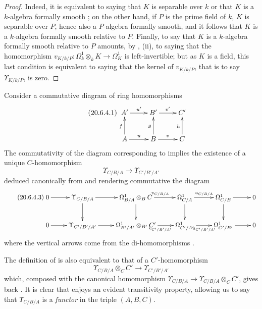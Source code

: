 \begin{proof}
Indeed, it is equivalent to saying that $K$ is separable over $k$ or that $K$ is a $k$-algebra formally smooth ; on the other hand, if $P$ is the prime field of $k$, $K$ is separable over $P$, hence also a $P$-algebra formally smooth, and it follows that $K$ is a $k$-algebra formally smooth relative to $P$.
Finally, to say that $K$ is a $k$-algebra formally smooth relative to $P$ amounts, by , (ii), to saying that the homomorphism $v_{K/k/P}:\Omega^1_k\otimes_k K\to\Omega^1_K$ is left-invertible; but as $K$ is a field, this last condition is equivalent to saying that the kernel of $v_{K/k/P}$, that is to say $\Upsilon_{K/k/P}$, is zero.
\end{proof}

\begin{env}[20.6.4]
\label{0.20.6.4}
Consider a commutative diagram of ring homomorphisms
\begin{equation}
\tag{20.6.4.1}
  \label{0.20.6.4.1}
\xymatrix{
  A' \ar[r]^{u'} & B' \ar[r]^{v'} & C' \\
  A \ar[u]^{f} \ar[r]^{u} & B \ar[u]^{g} \ar[r]^{v} & C \ar[u]^{h}
}
\end{equation}
The commutativity of the diagram corresponding to  implies the existence of a unique $C$-homomorphism
\begin{equation}
\tag{20.6.4.2}
  \label{0.20.6.4.2}
  \Upsilon_{C/B/A}\to\Upsilon_{C'/B'/A'}
\end{equation}
deduced canonically from  and rendering commutative the diagram
\begin{equation}
\tag{20.6.4.3}
  \label{0.20.6.4.3}
\xymatrix{
  0 \ar[r] & \Upsilon_{C/B/A} \ar[r] \ar[d] & \Omega^1_{B/A}\otimes_B C \ar[r]^{v_{C/B/A}} \ar[d] & \Omega^1_{C/A} \ar[r]^{u_{C/B/A}} \ar[d] & \Omega^1_{C/B} \ar[r] \ar[d] & 0 \\
  0 \ar[r] & \Upsilon_{C'/B'/A'} \ar[r] & \Omega^1_{B'/A'}\otimes_{B'} C' \ar[r]_{v_{C'/B'/A'}} & \Omega^1_{C'/A'} \ar[r]_{u_{C'/B'/A'}} & \Omega^1_{C'/B'} \ar[r] & 0
}
\end{equation}
where the vertical arrows come from the di-homomorphisms .

The definition of  is also equivalent to that of a $C'$-homomorphism
\begin{equation}
\tag{20.6.4.4}
  \label{0.20.6.4.4}
  \Upsilon_{C/B/A}\otimes_C C'\to\Upsilon_{C'/B'/A'}
\end{equation}
which, composed with the canonical homomorphism $\Upsilon_{C/B/A}\to\Upsilon_{C/B/A}\otimes_C C'$, gives back .
It is clear that  enjoys an evident transitivity property, allowing us to say that $\Upsilon_{C/B/A}$ is a \emph{functor} in the triple $(A,B,C)$.
\end{env}

